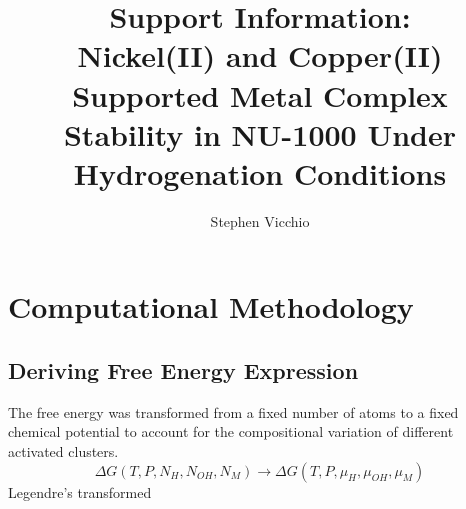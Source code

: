 \documentclass[12pt]{article}
\title{Support Information: \\
Nickel(II) and Copper(II) Supported Metal Complex Stability in NU-1000 Under Hydrogenation Conditions}
\author{Stephen Vicchio}
\begin{document}
\maketitle


\section{Computational Methodology}
\subsection{Deriving Free Energy Expression}
The free energy was transformed from a fixed number of atoms to a fixed chemical potential to account for the compositional variation of different activated clusters. 
\begin{equation}
    \Delta G(T,P,N_{H},N_{OH},N_{M}) \rightarrow \Delta G(T,P,\mu_{H},\mu_{OH},\mu_{M})
\end{equation}
Legendre's transformed 

\subsubsection{}
\end{document}

